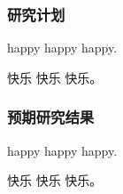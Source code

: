 
\justifying

\subsubsection{研究计划}

\indent\setlength{\parindent}{2em}%

happy happy happy.

快乐 快乐 快乐。

\subsubsection{预期研究结果}

\indent\setlength{\parindent}{2em}%

happy happy happy.

快乐 快乐 快乐。

\clearpage